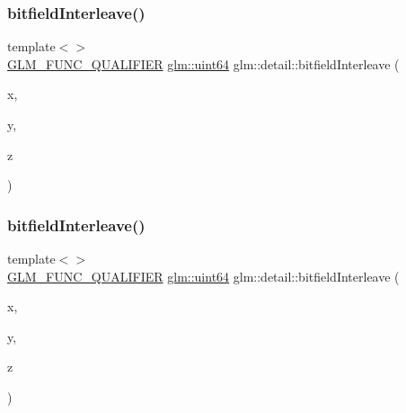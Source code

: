 \mbox{\label{namespaceglm_1_1detail_aceed48a30e6dc4f2c64945a60369d73d}} 
\subsubsection{\texorpdfstring{bitfield\+Interleave()}{bitfieldInterleave()}\hspace{0.1cm}{\footnotesize\ttfamily [8/11]}}
{\footnotesize\ttfamily template$<$$>$ \\
\mbox{\hyperlink{setup_8hpp_a33fdea6f91c5f834105f7415e2a64407}{G\+L\+M\+\_\+\+F\+U\+N\+C\+\_\+\+Q\+U\+A\+L\+I\+F\+I\+ER}} \mbox{\hyperlink{group__gtc__type__precision_gae3632bf9b37da66233d78930dd06378a}{glm\+::uint64}} glm\+::detail\+::bitfield\+Interleave (\begin{DoxyParamCaption}\item[{\mbox{\hyperlink{group__gtc__type__precision_gad8c2939e1fdd8e5828b31d95c52255d5}{glm\+::uint16}}}]{x,  }\item[{\mbox{\hyperlink{group__gtc__type__precision_gad8c2939e1fdd8e5828b31d95c52255d5}{glm\+::uint16}}}]{y,  }\item[{\mbox{\hyperlink{group__gtc__type__precision_gad8c2939e1fdd8e5828b31d95c52255d5}{glm\+::uint16}}}]{z }\end{DoxyParamCaption})}

\mbox{\label{namespaceglm_1_1detail_a7f6421e0b1180ec986fd91d8eb2d1cc9}} 
\subsubsection{\texorpdfstring{bitfield\+Interleave()}{bitfieldInterleave()}\hspace{0.1cm}{\footnotesize\ttfamily [9/11]}}
{\footnotesize\ttfamily template$<$$>$ \\
\mbox{\hyperlink{setup_8hpp_a33fdea6f91c5f834105f7415e2a64407}{G\+L\+M\+\_\+\+F\+U\+N\+C\+\_\+\+Q\+U\+A\+L\+I\+F\+I\+ER}} \mbox{\hyperlink{group__gtc__type__precision_gae3632bf9b37da66233d78930dd06378a}{glm\+::uint64}} glm\+::detail\+::bitfield\+Interleave (\begin{DoxyParamCaption}\item[{\mbox{\hyperlink{group__gtc__type__precision_ga202b6a53c105fcb7e531f9b443518451}{glm\+::uint32}}}]{x,  }\item[{\mbox{\hyperlink{group__gtc__type__precision_ga202b6a53c105fcb7e531f9b443518451}{glm\+::uint32}}}]{y,  }\item[{\mbox{\hyperlink{group__gtc__type__precision_ga202b6a53c105fcb7e531f9b443518451}{glm\+::uint32}}}]{z }\end{DoxyParamCaption})}


